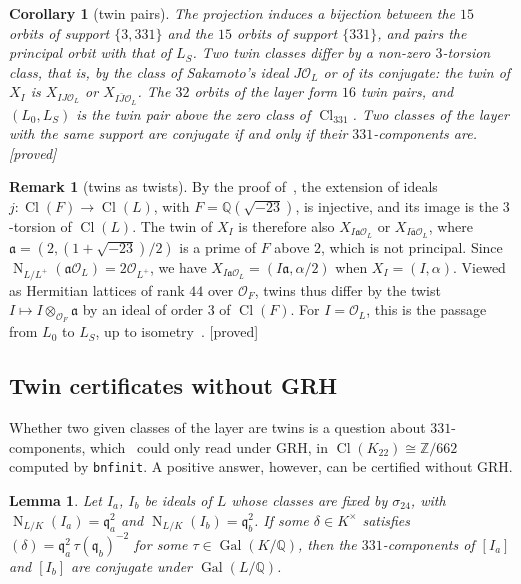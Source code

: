 \documentclass[11pt,a4paper]{amsart}
\theoremstyle{plain}
\newtheorem{lemma}[proposition]{Lemma}
\newtheorem{corollary}[proposition]{Corollary}
\theoremstyle{definition}
\newtheorem{remark}[proposition]{Remark}
\newcommand{\Q}{\mathbb{Q}}
\newcommand{\Z}{\mathbb{Z}}
\newcommand{\OO}{\mathcal{O}}
\newcommand{\q}{\mathfrak{q}}
\DeclareMathOperator{\Nm}{N}
\DeclareMathOperator{\Cl}{Cl}
\DeclareMathOperator{\Gal}{Gal}
\newcommand{\Lz}{L_{0}}
\newcommand{\LS}{L_{S}}
\newcommand{\st}[1]{\textup{\textsf{\small[#1]}}}
\newcommand{\DEM}{\st{proved}}
\begin{document}
\begin{corollary}[twin pairs]\label{cor:twins}
The projection induces a bijection between the $15$ orbits of support $\{3,331\}$ and the $15$ orbits of support $\{331\}$, and pairs the principal orbit with that of $\LS$. Two twin classes differ by a non-zero $3$-torsion class, that is, by the class of Sakamoto's ideal $J\OO_L$ or of its conjugate: the twin of $X_I$ is $X_{IJ\OO_L}$ or $X_{I\bar J\OO_L}$. The $32$ orbits of the layer form $16$ twin pairs, and $(\Lz,\LS)$ is the twin pair above the zero class of $\Cl_{331}$. Two classes of the layer with the same support are conjugate if and only if their $331$-components are. \DEM
\end{corollary}

\begin{remark}[twins as twists]
By the proof of~\cite[Prop.~6.7]{Gau26}, the extension of ideals $j\colon\Cl(F)\to\Cl(L)$, with $F=\Q(\sqrt{-23})$, is injective, and its image is the $3$-torsion of $\Cl(L)$. The twin of $X_I$ is therefore also $X_{I\mathfrak a\OO_L}$ or $X_{I\bar{\mathfrak a}\OO_L}$, where $\mathfrak a=(2,(1+\sqrt{-23})/2)$ is a prime of $F$ above $2$, which is not principal. Since $\Nm_{L/L^+}(\mathfrak a\OO_L)=2\OO_{L^+}$, we have $X_{I\mathfrak a\OO_L}=(I\mathfrak a,\alpha/2)$ when $X_I=(I,\alpha)$. Viewed as Hermitian lattices of rank $44$ over $\OO_F$, twins thus differ by the twist $I\mapsto I\otimes_{\OO_F}\mathfrak a$ by an ideal of order $3$ of $\Cl(F)$. For $I=\OO_L$, this is the passage from $\Lz$ to $\LS$, up to isometry~\cite[Prop.~2.7]{Gau26}. \DEM
\end{remark}

\subsection{Twin certificates without GRH}
Whether two given classes of the layer are twins is a question about $331$-components, which~\cite{Gau26} could only read under GRH, in $\Cl(K_{22})\cong\Z/662$ computed by \texttt{bnfinit}. A positive answer, however, can be certified without GRH.

\begin{lemma}\label{lem:cert}
Let $I_a$, $I_b$ be ideals of $L$ whose classes are fixed by $\sigma_{24}$, with $\Nm_{L/K}(I_a)=\q_a^2$ and $\Nm_{L/K}(I_b)=\q_b^2$. If some $\delta\in K^\times$ satisfies $(\delta)=\q_a^2\,\tau(\q_b)^{-2}$ for some $\tau\in\Gal(K/\Q)$, then the $331$-components of $[I_a]$ and $[I_b]$ are conjugate under $\Gal(L/\Q)$.
\end{lemma}
\end{document}
